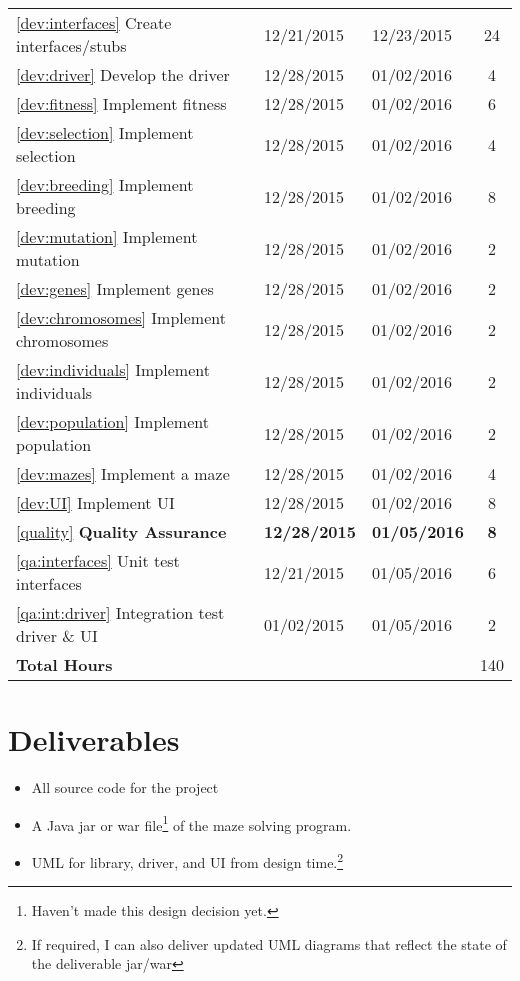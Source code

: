 \documentclass[letterpaper, 12pt]{article}
\begin{document}
\begin{longtable}{lllc}
	 \ref{dev:interfaces} Create interfaces/stubs 		& 12/21/2015 & 12/23/2015 & 24 \\
	 \ref{dev:driver} Develop the driver					& 12/28/2015 & 01/02/2016 & 4  \\
	 \ref{dev:fitness} Implement fitness					& 12/28/2015 & 01/02/2016 & 6  \\
	 \ref{dev:selection} Implement selection				& 12/28/2015 & 01/02/2016 & 4  \\
	 \ref{dev:breeding} Implement breeding					& 12/28/2015 & 01/02/2016 & 8	 \\
	 \ref{dev:mutation} Implement mutation					& 12/28/2015 & 01/02/2016 & 2	 \\
	 \ref{dev:genes} Implement genes							& 12/28/2015 & 01/02/2016 & 2	 \\
	 \ref{dev:chromosomes} Implement chromosomes			& 12/28/2015 & 01/02/2016 & 2	 \\
	 \ref{dev:individuals} Implement individuals			& 12/28/2015 & 01/02/2016 & 2	 \\
	 \ref{dev:population} Implement population			& 12/28/2015 & 01/02/2016 & 2	 \\
	 \ref{dev:mazes} Implement a maze						& 12/28/2015 & 01/02/2016 & 4	 \\
	 \ref{dev:UI} Implement UI									& 12/28/2015 & 01/02/2016 & 8	 \\
	 \ref{quality} \bf Quality Assurance					& \bf 12/28/2015 & \bf 01/05/2016 & \bf 8 \\
	 \ref{qa:interfaces} Unit test interfaces          & 12/21/2015 & 01/05/2016 & 6 \\
	 \ref{qa:int:driver} Integration test driver \& UI	& 01/02/2015 & 01/05/2016 & 2 \\
	 \midrule
	 \multicolumn{3}{l}{\textbf{Total Hours}} & 140 \\
	 \bottomrule
  \end{longtable}
\section{Deliverables}
  \begin{itemize}
	 \item All source code for the project
	 \item A Java jar or war file\footnote{Haven't made this design decision yet.} of the maze solving program.
	 \item UML for library, driver, and UI from design time.\footnote{If required, I can also deliver updated UML diagrams that reflect the state of the deliverable jar/war}
  \end{itemize}
\end{document}
